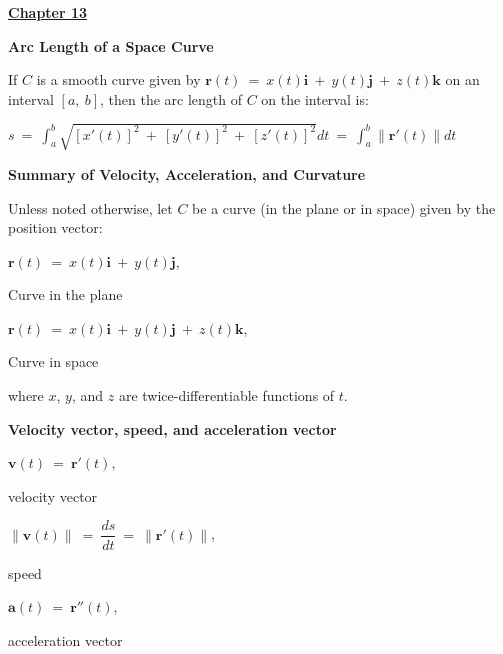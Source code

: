 \documentclass{article}
\begin{document}
\begin{large}
\underline{\textbf{\huge Chapter 13 \phantom{ } \phantom{ } \phantom{ } \phantom{ }}}

\vspace{-0.1in}
\textbf{Arc Length of a Space Curve}

\hspace{0.1in} If $C$ is a smooth curve given by $\textbf{r}(t)\ =\ x(t)\textbf{i}\ +\ y(t)\textbf{j}\ +\ z(t)\textbf{k}$ on an interval $[a,\ b]$, then the arc length of $C$ on the interval is:

\hspace{1.0in} $s\ =\ \displaystyle\int^{b}_{a}\sqrt{[x'(t)]^{2}\ +\ [y'(t)]^{2}\ +\ [z'(t)]^{2}}dt\ =\ \displaystyle\int^{b}_{a}\|\textbf{r}'(t)\|dt$

\textbf{Summary of Velocity, Acceleration, and Curvature}

\hspace{0.1in} Unless noted otherwise, let $C$ be a curve (in the plane or in space) given by the position vector:

\vspace{-0.2in}
\hspace{2.0in} $\textbf{r}(t)\ =\ x(t)\textbf{i}\ +\ y(t)\textbf{j}$, \begin{Large} Curve in the plane \end{Large}


\hspace{2.0in} $\textbf{r}(t)\ =\ x(t)\textbf{i}\ +\ y(t)\textbf{j}\ +\ z(t)\textbf{k}$, \begin{large} Curve in space \end{large}

\hspace{0.1in} where $x$, $y$, and $z$ are twice-differentiable functions of $t$.

\hspace{0.1in} \textbf{Velocity vector, speed, and acceleration vector}

\hspace{1.0in} $\textbf{v}(t)\ =\ \textbf{r}'(t)$, \begin{Large} velocity vector \end{Large}

\hspace{1.0in} $\|\textbf{v}(t)\|\ =\ \dfrac{ds}{dt}\ =\ \|\textbf{r}'(t)\|$, \begin{Large} speed \end{Large}

\hspace{1.0in} $\textbf{a}(t)\ =\ \textbf{r}''(t)$, \begin{Large} acceleration vector \end{Large}


\end{large}
\end{document}

